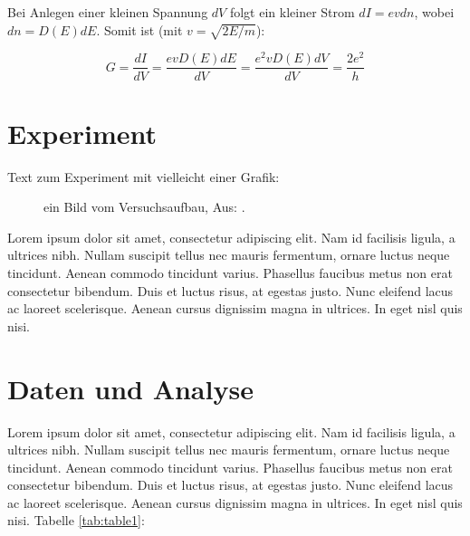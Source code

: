 \documentclass[aps,twocolumn,secnumarabic,nobalancelastpage,amsmath,amssymb,
nofootinbib,superscriptaddress]{revtex4-1}
\begin{document}
Bei Anlegen einer kleinen Spannung $dV$ folgt ein kleiner Strom $dI = e v dn$,
wobei $dn = D(E)dE$. Somit ist (mit $v = \sqrt{2E/m}$):

  \begin{equation}
    G = \frac{dI}{dV} = \frac{evD(E)dE}{dV} = \frac{e^2vD(E)dV}{dV} = \frac{2e^2}{h}
  \end{equation}






\section{Experiment}

Text zum Experiment mit vielleicht einer Grafik:

\begin{figure}[h]

\caption{ein Bild vom Versuchsaufbau, Aus: \cite{melissinos1966,melissinos2003}.}
\label{fig:samplefig}
\end{figure}

Lorem ipsum dolor sit amet, consectetur adipiscing elit. Nam id facilisis ligula,
a ultrices nibh. Nullam suscipit tellus nec mauris fermentum, ornare luctus neque
tincidunt. Aenean commodo tincidunt varius. Phasellus faucibus metus non erat
consectetur bibendum. Duis et luctus risus, at egestas justo. Nunc eleifend lacus
ac laoreet scelerisque. Aenean cursus dignissim magna in ultrices. In eget nisl
quis nisi.



\section{Daten und Analyse}

Lorem ipsum dolor sit amet, consectetur adipiscing elit. Nam id facilisis ligula,
a ultrices nibh. Nullam suscipit tellus nec mauris fermentum, ornare luctus neque
tincidunt. Aenean commodo tincidunt varius. Phasellus faucibus metus non erat
consectetur bibendum. Duis et luctus risus, at egestas justo. Nunc eleifend lacus
ac laoreet scelerisque. Aenean cursus dignissim magna in ultrices. In eget nisl
quis nisi. Tabelle \ref{tab:table1}:
\end{document}
